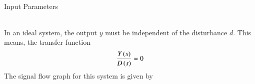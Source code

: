 \documentclass[journal,12pt,twocolumn]{IEEEtran}
\theoremstyle{remark}
\begin{document}
\solution \\
\begin{table}[h!]
    \centering
    
    \caption{Input Parameters}
    \label{Gate22.CH23.tab: 1}
\end{table}
\\
In an ideal system, the output $y$ must be independent of the disturbance $d$. This means, the transfer function $$\frac{Y\left(s\right)}{D\left(s\right)}=0$$
The signal flow graph for this system is given by


\end{document}
